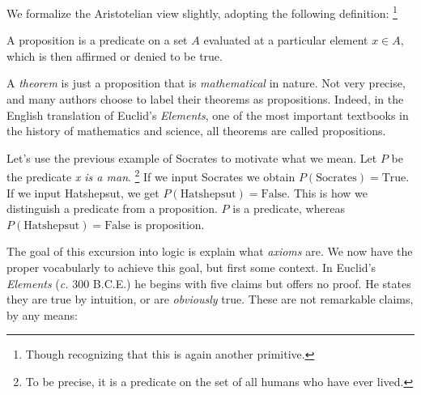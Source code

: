             We formalize the Aristotelian view slightly, adopting the
            following definition:%
            \footnote{%
                Though recognizing that this is again another primitive.
            }
            \begin{definition}
                \label{def:Proposition}%
                A \gls{proposition} is a \gls{predicate} on a \gls{set} $A$
                evaluated at a particular element $x\in{A}$, which is then
                affirmed or denied to be true.%
            \end{definition}
            A \textit{theorem} is just
            a proposition that is \textit{mathematical} in nature. Not very
            precise, and many authors choose to label their theorems as
            propositions. Indeed, in the English translation of Euclid's
            \textit{Elements}, one of the most important textbooks in the
            history of mathematics and science, all theorems are called
            propositions.
            \begin{example}
                Let's use the previous example of Socrates to motivate what we
                mean. Let $P$ be the predicate \textit{x is a man}.%
                \footnote{%
                    To be precise, it is a predicate on the set of all humans
                    who have ever lived.
                }
                If we input Socrates we obtain $P(\text{Socrates})=\text{True}$.
                If we input Hatshepsut, we get
                $P(\text{Hatshepsut})=\text{False}$. This is how we distinguish
                a predicate from a proposition. $P$ is a predicate, whereas
                $P(\text{Hatshepsut})=\text{False}$ is proposition.
            \end{example}
            The goal of this excursion into logic is explain what
            \textit{axioms} are. We now have the proper vocabularly to achieve
            this goal, but first some context.
            In Euclid's \textit{Elements} (\textit{c.} 300 B.C.E.) he begins
            with five claims but offers no proof. He states they are true by
            intuition, or are \textit{obviously} true. These are not remarkable
            claims, by any means:
